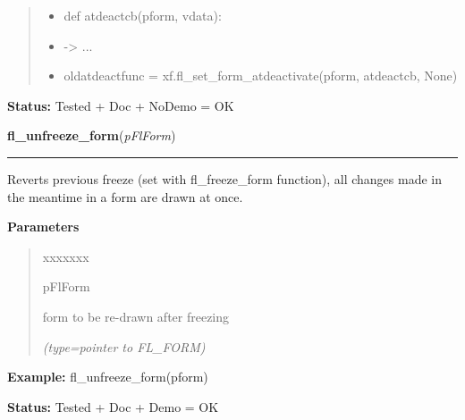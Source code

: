 \begin{boxedminipage}{\funcwidth}
\begin{quote}
\begin{itemize}
  \item
    \setlength{\parskip}{0.6ex}
def atdeactcb(pform, vdata):



  \item {\textbar}-{\textgreater}{\textbar} ...



  \item oldatdeactfunc = xf.fl\_set\_form\_atdeactivate(pform, atdeactcb, None)



\end{itemize}

\end{quote}

\textbf{Status:} Tested + Doc + NoDemo = OK



    \end{boxedminipage}

    \label{xformslib:flbasic:fl_unfreeze_form}

    \vspace{0.5ex}

\hspace{.8\funcindent}\begin{boxedminipage}{\funcwidth}

    \raggedright \textbf{fl\_unfreeze\_form}(\textit{pFlForm})

    \vspace{-1.5ex}

    \rule{\textwidth}{0.5\fboxrule}
\setlength{\parskip}{2ex}
    Reverts previous freeze (set with fl\_freeze\_form function), all 
    changes made in the meantime in a form are drawn at once.

\setlength{\parskip}{1ex}
      \textbf{Parameters}
      \vspace{-1ex}

      \begin{quote}
        \begin{Ventry}{xxxxxxx}

          \item[pFlForm]

          form to be re-drawn after freezing

            {\it (type=pointer to FL\_FORM)}

        \end{Ventry}

      \end{quote}

\textbf{Example:} fl\_unfreeze\_form(pform)



\textbf{Status:} Tested + Doc + Demo = OK



    \end{boxedminipage}

